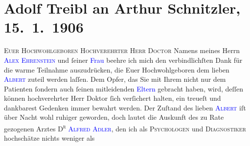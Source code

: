

               \section[Adolf Treibl an Arthur Schnitzler, 15. 1. 1906]{ Adolf Treibl an Arthur Schnitzler, 15. 1. 1906}\nopagebreak{}\rehead{ }\normalsize\beginnumbering{} \toendnotes[C]{\smallbreak\pagebreak[2]} 
\toendnotes[C]{\smallbreak}\pstart
           \noindent{}{\pb}\textsc{Euer Hochwohlgeboren}\pend
           \pstart{}\textsc{Hochverehrter Herr Doctor}\pend\pstart
           Namens meines \label{K_L01572_1v}\label{K_L01572_1h} Herrn \textcolor{blue}{\textsc{Alex Ehrenstein}}{}\ledrightnote{\textcolor{blue}{Alexander Ehrenstein}} und ſeiner \textcolor{blue}{Frau}{}
                    beehre ich mich den verbindlichſten Dank für die warme Teilnahme auszudrücken,
                    die Euer Hochwohlgeboren dem lieben \textcolor{blue}{\textsc{Albert}}{}\ledrightnote{\textcolor{blue}{Albert Ehrenstein}} zuteil werden laſſen. {\pb}Dem Opfer, das Sie
                    mit Ihrem \label{K_L01572_2v}\label{K_L01572_2h} nicht nur dem Patienten ſondern auch ſeinen mitleidenden \textcolor{blue}{Eltern}{} gebracht
                    haben, wird, deſſen können hochverehrter Herr Doktor ſich verſichert halten, ein
                    treueſt und dankbarest Gedenken immer bewahrt werden.\pend
           \pstart
           Der Zuſtand des lieben \textcolor{blue}{\textsc{Albert}}{}\ledrightnote{\textcolor{blue}{Albert Ehrenstein}} iſt über Nacht wohl ruhiger geworden, doch lautet {\pb}die Auskunft des zu Rate gezogenen Arztes \textsc{D\textsuperscript{r}{ }\textcolor{blue}{Alfred Adler}{}\ledrightnote{\textcolor{blue}{Alfred Adler}}}, den ich als \textsc{Psychologen} und \textsc{Diagnostiker} hochschätze nichts weniger als
